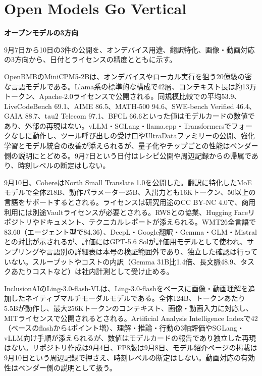 \section{Open Models Go Vertical}
\begin{wideflow}
{\Large\bfseries オープンモデルの3方向}\par
\smallskip
{\color{SurveyMuted}9月7日から10日の3件の公開を、オンデバイス用途、翻訳特化、画像・動画対応の3方向から、日付とライセンスの精度とともに示す。}\par
\end{wideflow}

OpenBMBのMiniCPM5-2Bは、オンデバイスやローカル実行を狙う20億級の密な言語モデルである\cite{minicpm}。Llama系の標準的な構成で42層、コンテキスト長は約13万トークン、Apache-2.0ライセンスで公開される。同規模比較での平均53.9、LiveCodeBench 69.1、AIME 86.5、MATH-500 94.6、SWE-bench Verified 46.4、GAIA 88.7、tau2 Telecom 97.1、BFCL 66.6といった値はモデルカードの数値であり、外部の再現はない。vLLM・SGLang・llama.cpp・Transformersでフォークなしに動作し、ツール呼び出しの受け口やUltraDataファミリーの公開、強化学習とモデル統合の改善が添えられるが、量子化やチップごとの性能はベンダー側の説明にとどめる。9月7日という日付はレシピ公開や周辺記録からの帰属であり、時刻レベルの断定はしない。

9月10日、CohereはNorth Small Translate 1.0を公開した\cite{north}。翻訳に特化したMoEモデルで全体218B、動作パラメーター25B、入出力とも16Kトークン、50以上の言語をサポートするとされる。ライセンスは研究用途のCC BY-NC 4.0で、商用利用には別途Vaultライセンスが必要とされる。RWSとの協業、Hugging Faceリポジトリやドキュメント、テクニカルレポートが添えられる。WMT26全言語で83.60（エージェント型で84.36）、DeepL・Google翻訳・Gemma・GLM・Mistralとの対比が示されるが、評価にはGPT-5.6 Solが評価用モデルとして使われ、サンプリングや言語別の詳細表は本号の検証範囲外であり、独立した確認は行っていない。スループットやコストの内訳（Gemma 31B比1.4倍、長文脈48.9、タスクあたりコストなど）は社内計測として受け止める。

InclusionAIのLing-3.0-flash-VLは、Ling-3.0-flashをベースに画像・動画理解を追加したネイティブマルチモーダルモデルである\cite{ling}。全体124B、トークンあたり5.5Bが動作し、最大256Kトークンのコンテキスト、画像・動画入力に対応し、MITライセンスで公開されるとされる。Artificial Analysis Intelligence Indexで42（ベースのflashから4ポイント増）、理解・推論・行動の3軸評価やSGLang・vLLM向け手順が添えられるが、数値はモデルカードの報告であり独立した再現はない。リポジトリ作成は9月4日、FP8版は9月8日、モデル紹介ページの掲載は9月10日という周辺記録で押さえ、時刻レベルの断定はしない。動画対応の有効性はベンダー側の説明として扱う。

